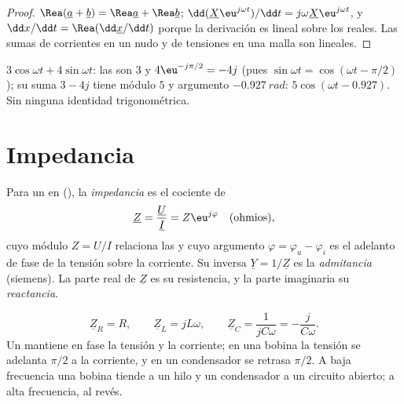 \begin{proof}
$\Rea(\underline a + \underline b) = \Rea\underline a + \Rea\underline b$;
$\dd(\underline X\eu^{j\omega t})/\dd t = j\omega\underline X\eu^{j\omega t}$,
y $\dd x/\dd t = \Rea(\dd\underline x/\dd t)$ porque la derivación es
lineal sobre los reales. Las sumas de corrientes en un nudo y de
tensiones en una malla son lineales.
\end{proof}

\begin{example}\label{ex:b1:sinusoidal-impedance:add}
$3\cos\omega t + 4\sin\omega t$: las  son $3$ y
$4\eu^{-j\pi/2} = -4j$ (pues $\sin\omega t = \cos(\omega t - \pi/2)$); su
suma $3 - 4j$ tiene módulo $5$ y argumento $-0.927\ \unit{rad}$:
$5\cos(\omega t - 0.927)$. Sin ninguna identidad trigonométrica.
\end{example}

\section{Impedancia}

\begin{definition}\label{def:b1:sinusoidal-impedance:impedance}
Para un  en  (), la \emph{impedancia} es el cociente de 
\[
\underline Z = \frac{\underline U}{\underline I} = Z\eu^{j\varphi}
\quad (\text{ohmios}),
\]
cuyo módulo $Z = U/I$ relaciona las  y cuyo argumento
$\varphi = \varphi_u - \varphi_i$ es el adelanto de fase de la tensión
sobre la corriente. Su inversa $\underline Y = 1/\underline Z$ es la
\emph{admitancia} (siemens). La parte real de $\underline Z$ es su
resistencia, y la parte imaginaria su \emph{reactancia}.
\end{definition}

\begin{proposition}[Impedancias de R, L y C]\label{prop:b1:sinusoidal-impedance:rlc}
\[
\underline Z_R = R, \qquad \underline Z_L = jL\omega, \qquad
\underline Z_C = \frac{1}{jC\omega} = -\frac{j}{C\omega} .
\]
Un  mantiene en fase la tensión y la corriente; en una bobina la
tensión se adelanta $\pi/2$ a la corriente, y en un condensador se
retrasa $\pi/2$. A baja frecuencia una bobina tiende a un hilo y un
condensador a un circuito abierto; a alta frecuencia, al revés.
\end{proposition}


